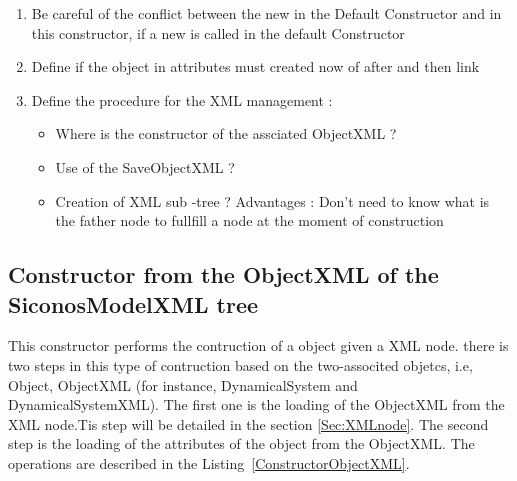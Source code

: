 



 \begin{ndr}
   \begin{enumerate}
   \item Be careful of the conflict between the new in the Default Constructor and in this constructor, if a new is called in the default Constructor
   \item Define if the object in attributes must created now of after and then link
   \item Define the procedure for the XML management :
     \begin{itemize}
     \item  Where  is the constructor of the assciated ObjectXML ? 
     \item  Use of the SaveObjectXML ?
     \item  Creation of XML sub -tree ? Advantages : Don't need to know what is the father node to fullfill a node at the moment of construction
     \end{itemize}
   \end{enumerate}
 \end{ndr}


\subsection{Constructor from the ObjectXML of the SiconosModelXML tree}

This constructor performs  the contruction of a object given a XML node. there is two steps in this type of contruction  based on the two-associted objetcs, i.e, Object, ObjectXML (for instance, DynamicalSystem and DynamicalSystemXML). The first one is the loading of the ObjectXML from the XML node.Tis step will be detailed in the section \ref{Sec:XMLnode}. The second  step is the loading of the attributes of the object from the ObjectXML. The operations are described in the Listing~\ref{ConstructorObjectXML}.

